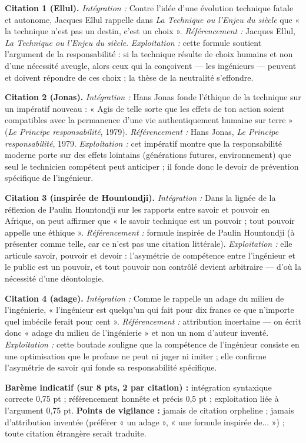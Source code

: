 \documentclass[11pt]{article}
\begin{document}
\begin{corrige}
\textbf{Citation 1 (Ellul).} \emph{Intégration :} Contre l'idée d'une évolution technique fatale et autonome, Jacques Ellul rappelle dans \emph{La Technique ou l'Enjeu du siècle} que « la technique n'est pas un destin, c'est un choix ». \emph{Référencement :} Jacques Ellul, \emph{La Technique ou l'Enjeu du siècle}. \emph{Exploitation :} cette formule soutient l'argument de la responsabilité : si la technique résulte de choix humains et non d'une nécessité aveugle, alors ceux qui la conçoivent — les ingénieurs — peuvent et doivent répondre de ces choix ; la thèse de la neutralité s'effondre.\par
\textbf{Citation 2 (Jonas).} \emph{Intégration :} Hans Jonas fonde l'éthique de la technique sur un impératif nouveau : « Agis de telle sorte que les effets de ton action soient compatibles avec la permanence d'une vie authentiquement humaine sur terre » (\emph{Le Principe responsabilité}, 1979). \emph{Référencement :} Hans Jonas, \emph{Le Principe responsabilité}, 1979. \emph{Exploitation :} cet impératif montre que la responsabilité moderne porte sur des effets lointains (générations futures, environnement) que seul le technicien compétent peut anticiper ; il fonde donc le devoir de prévention spécifique de l'ingénieur.\par
\textbf{Citation 3 (inspirée de Hountondji).} \emph{Intégration :} Dans la lignée de la réflexion de Paulin Hountondji sur les rapports entre savoir et pouvoir en Afrique, on peut affirmer que « le savoir technique est un pouvoir ; tout pouvoir appelle une éthique ». \emph{Référencement :} formule inspirée de Paulin Hountondji (à présenter comme telle, car ce n'est pas une citation littérale). \emph{Exploitation :} elle articule savoir, pouvoir et devoir : l'asymétrie de compétence entre l'ingénieur et le public est un pouvoir, et tout pouvoir non contrôlé devient arbitraire — d'où la nécessité d'une déontologie.\par
\textbf{Citation 4 (adage).} \emph{Intégration :} Comme le rappelle un adage du milieu de l'ingénierie, « l'ingénieur est quelqu'un qui fait pour dix francs ce que n'importe quel imbécile ferait pour cent ». \emph{Référencement :} attribution incertaine — on écrit donc « adage du milieu de l'ingénierie » et non un nom d'auteur inventé. \emph{Exploitation :} cette boutade souligne que la compétence de l'ingénieur consiste en une optimisation que le profane ne peut ni juger ni imiter ; elle confirme l'asymétrie de savoir qui fonde sa responsabilité spécifique.\par
\textbf{Barème indicatif (sur 8 pts, 2 par citation) :} intégration syntaxique correcte 0,75 pt ; référencement honnête et précis 0,5 pt ; exploitation liée à l'argument 0,75 pt.
\textbf{Points de vigilance :} jamais de citation orpheline ; jamais d'attribution inventée (préférer « un adage », « une formule inspirée de... ») ; toute citation étrangère serait traduite.
\end{corrige}
\end{document}
